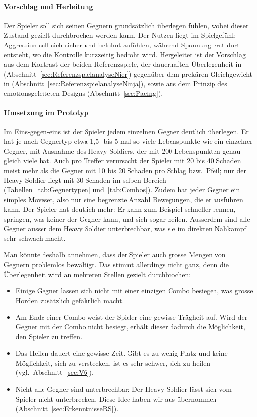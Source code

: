 \documentclass[../Main.tex]{subfiles}
\begin{document}
\paragraph{Vorschlag und Herleitung}
Der Spieler soll sich seinen Gegnern grundsätzlich überlegen fühlen, wobei dieser Zustand gezielt durchbrochen werden kann. Der Nutzen liegt im Spielgefühl: Aggression soll sich sicher und belohnt anfühlen, während Spannung erst dort entsteht, wo die Kontrolle kurzzeitig bedroht wird. Hergeleitet ist der Vorschlag aus dem Kontrast der beiden Referenzspiele, der dauerhaften Überlegenheit in  (Abschnitt~\ref{sec:ReferenzspielanalyseNier}) gegenüber dem prekären Gleichgewicht in  (Abschnitt~\ref{sec:ReferenzspielanalyseNinja}), sowie aus dem Prinzip des emotionsgeleiteten Designs (Abschnitt~\ref{sec:Pacing}).

\paragraph{Umsetzung im Prototyp}
Im Eins-gegen-eins ist der Spieler jedem einzelnen Gegner deutlich überlegen. Er hat je nach Gegnertyp etwa 1,5- bis 5-mal so viele Lebenspunkte wie ein einzelner Gegner, mit Ausnahme des Heavy Soldiers, der mit 200 Lebenspunkten genau gleich viele hat. Auch pro Treffer verursacht der Spieler mit 20 bis 40 Schaden meist mehr als die Gegner mit 10 bis 20 Schaden pro Schlag bzw.\ Pfeil; nur der Heavy Soldier liegt mit 30 Schaden im selben Bereich (Tabellen~\ref{tab:Gegnertypen} und~\ref{tab:Combos}). Zudem hat jeder Gegner ein simples Moveset, also nur eine begrenzte Anzahl Bewegungen, die er ausführen kann. Der Spieler hat deutlich mehr: Er kann zum Beispiel schneller rennen, springen, was keiner der Gegner kann, und sich sogar heilen. Ausserdem sind alle Gegner ausser dem Heavy Soldier unterbrechbar, was sie im direkten Nahkampf sehr schwach macht.

Man könnte deshalb annehmen, dass der Spieler auch grosse Mengen von Gegnern problemlos bewältigt. Das stimmt allerdings nicht ganz, denn die Überlegenheit wird an mehreren Stellen gezielt durchbrochen:

\begin{itemize}[leftmargin=1.5cm]
    \item Einige Gegner lassen sich nicht mit einer einzigen Combo besiegen, was grosse Horden zusätzlich gefährlich macht.
    \item Am Ende einer Combo weist der Spieler eine gewisse Trägheit auf. Wird der Gegner mit der Combo nicht besiegt, erhält dieser dadurch die Möglichkeit, den Spieler zu treffen.
    \item Das Heilen dauert eine gewisse Zeit. Gibt es zu wenig Platz und keine Möglichkeit, sich zu verstecken, ist es sehr schwer, sich zu heilen (vgl.~Abschnitt~\ref{sec:V6}).
    \item Nicht alle Gegner sind unterbrechbar: Der Heavy Soldier lässt sich vom Spieler nicht unterbrechen. Diese Idee haben wir aus  übernommen (Abschnitt~\ref{sec:ErkenntnisseRS}).
\end{itemize}
\end{document}
